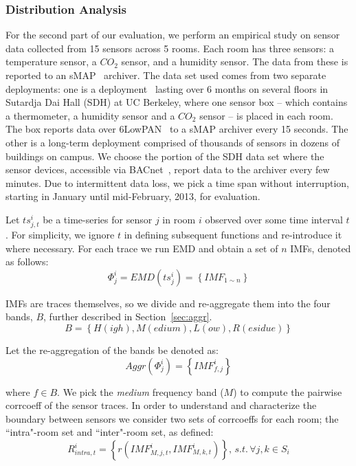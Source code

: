 \subsubsection{Distribution Analysis}
For the second part of our evaluation, we perform an empirical study on sensor data collected from 15 sensors across 5 rooms. 
Each room has three sensors: a temperature sensor, a $CO_{2}$ sensor,  and a humidity sensor. 
The data from these is reported to an  
sMAP~\cite{smap} archiver. The data set used comes from two separate deployments: one is a deployment~\cite{Jay} lasting 
over 6 months on several floors in Sutardja Dai Hall (SDH) at UC Berkeley, where one sensor box -- which contains a thermometer, a humidity sensor
 and a $CO_{2}$ sensor -- is placed in each room. The box reports data over 6LowPAN~\cite{6lowpan} to a sMAP archiver every 
 15 seconds. The other is a long-term deployment comprised of thousands of sensors in dozens of buildings on campus. 
 We choose the portion of the SDH data set where the sensor devices, accessible via BACnet~\cite{BACnet}, report data to the archiver every few minutes. 
 Due to intermittent data loss, we pick a time span without interruption, starting in January until mid-February, 2013, for evaluation.

Let $ts^{i}_{j,t}$ be a time-series for sensor $j$ in room $i$ observed over some time interval $t$.  For simplicity, we ignore
$t$ in defining subsequent functions and re-introduce it where necessary.
For each trace we run EMD and obtain a set of $n$ IMFs, denoted as follows:
\begin{displaymath}
\Phi^i_j = EMD(ts^i_j) = \left \{ IMF_{1\sim n} \right \}
\end{displaymath}

IMFs are traces themselves, so we divide and re-aggregate them into the four bands, $B$,
further described in Section~\ref{sec:aggr}.
\begin{displaymath}
B = \left \{ H(igh), M(edium), L(ow), R(esidue) \right \}
\end{displaymath} 

Let the re-aggregation of the bands be denoted as:
\begin{displaymath}
Aggr(\Phi^i_j) = \left \{ IMF^i_{f,j} \right \}
\end{displaymath} 

where $f \in B$.  We pick the \emph{medium} frequency band ($M$) to compute the pairwise corrcoeff of the sensor traces. 
In order to understand and characterize the boundary between sensors we consider two sets of corrcoeffs for each room; the ``intra"-room set and 
``inter"-room set, as defined:
\begin{displaymath}
R^{i}_{intra,t} = \left \{ r(IMF^{i}_{M,j,t}, IMF^{i}_{M,k,t}) \right \}, \,
s.t.\, \forall j,k \in S_i
\end{displaymath}

